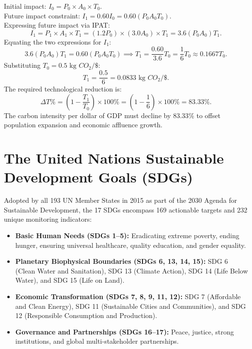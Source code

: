 \begin{solutionbox}
Initial impact: $I_0 = P_0 \times A_0 \times T_0$. \\
Future impact constraint: $I_1 = 0.60 I_0 = 0.60 (P_0 A_0 T_0)$. \\
Expressing future impact via IPAT:
\begin{equation*}
I_1 = P_1 \times A_1 \times T_1 = (1.2 P_0) \times (3.0 A_0) \times T_1 = 3.6 (P_0 A_0) T_1.
\end{equation*}
Equating the two expressions for $I_1$:
\begin{equation*}
3.6 (P_0 A_0) T_1 = 0.60 (P_0 A_0 T_0) \implies T_1 = \frac{0.60}{3.6} T_0 = \frac{1}{6} T_0 \approx 0.1667 T_0.
\end{equation*}
Substituting $T_0 = 0.5\text{ kg } CO_2/\$$:
\begin{equation*}
T_1 = \frac{0.5}{6} = 0.0833\text{ kg } CO_2/\$.
\end{equation*}
The required technological reduction is:
\begin{equation*}
\Delta T\% = \left(1 - \frac{T_1}{T_0}\right) \times 100\% = \left(1 - \frac{1}{6}\right) \times 100\% = 83.33\%.
\end{equation*}
The carbon intensity per dollar of GDP must decline by $83.33\%$ to offset population expansion and economic affluence growth.
\end{solutionbox}

\section{The United Nations Sustainable Development Goals (SDGs)}
Adopted by all 193 UN Member States in 2015 as part of the 2030 Agenda for Sustainable Development, the 17 SDGs encompass 169 actionable targets and 232 unique monitoring indicators:
\begin{itemize}[leftmargin=1.5em]
    \item \textbf{Basic Human Needs (SDGs 1--5):} Eradicating extreme poverty, ending hunger, ensuring universal healthcare, quality education, and gender equality.
    \item \textbf{Planetary Biophysical Boundaries (SDGs 6, 13, 14, 15):} SDG 6 (Clean Water and Sanitation), SDG 13 (Climate Action), SDG 14 (Life Below Water), and SDG 15 (Life on Land).
    \item \textbf{Economic Transformation (SDGs 7, 8, 9, 11, 12):} SDG 7 (Affordable and Clean Energy), SDG 11 (Sustainable Cities and Communities), and SDG 12 (Responsible Consumption and Production).
    \item \textbf{Governance and Partnerships (SDGs 16--17):} Peace, justice, strong institutions, and global multi-stakeholder partnerships.
\end{itemize}

